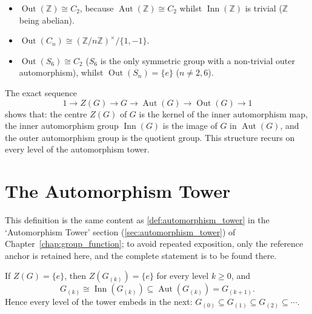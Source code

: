 \begin{example}\label{ex:outer_automorphism_examples}
\begin{itemize}
    \item $\operatorname{Out}(\mathbb{Z}) \cong C_2$, because $\operatorname{Aut}(\mathbb{Z})\cong C_2$ whilst $\operatorname{Inn}(\mathbb{Z})$ is trivial ($\mathbb{Z}$ being abelian).
    \item $\operatorname{Out}(C_n) \cong (\mathbb{Z}/n\mathbb{Z})^\times/\{1,-1\}$.
    \item $\operatorname{Out}(S_6) \cong C_2$ ($S_6$ is the only symmetric group with a non-trivial outer automorphism), whilst $\operatorname{Out}(S_n)=\{e\}$ ($n\neq 2,6$).
\end{itemize}
\end{example}

\begin{remark}\label{rem:exact_sequence_operator}
The exact sequence
\[
1 \to Z(G) \to G \to \operatorname{Aut}(G) \to \operatorname{Out}(G) \to 1
\]
shows that: the centre $Z(G)$ of $G$ is the kernel of the inner automorphism map, the inner automorphism group $\operatorname{Inn}(G)$ is the image of $G$ in $\operatorname{Aut}(G)$, and the outer automorphism group is the quotient group. This structure recurs on every level of the automorphism tower.
\end{remark}

\section{The Automorphism Tower}

\begin{definition}\label{def:higher_automorphism_tower}
This definition is the same content as \cref{def:automorphism_tower} in the `Automorphism Tower' section (\cref{sec:automorphism_tower}) of Chapter~\ref{chap:group_function}; to avoid repeated exposition, only the reference anchor is retained here, and the complete statement is to be found there.
\end{definition}

\begin{proposition}\label{prop:tower_embedding_chain}
If $Z(G)=\{e\}$, then $Z(G_{(k)})=\{e\}$ for every level $k\ge 0$, and
\[
G_{(k)} \cong \operatorname{Inn}(G_{(k)}) \subseteq \operatorname{Aut}(G_{(k)}) = G_{(k+1)}.
\]
Hence every level of the tower embeds in the next: $G_{(0)} \subseteq G_{(1)} \subseteq G_{(2)} \subseteq \cdots$.
\end{proposition}


